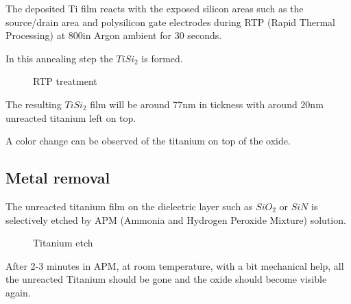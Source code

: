 The deposited Ti film reacts with the exposed silicon areas such as the source/drain area and polysilicon gate electrodes during RTP (Rapid Thermal Processing) at 800\degreesC in Argon ambient for 30 seconds.

In this annealing step the $Ti Si_2$ is formed.

\begin{figure}[H]
	\centering
	\begin{tikzpicture}[node distance = 3cm, auto, thick,scale=\CrossSectionOnly, every node/.style={transform shape}]
		
	\end{tikzpicture}
	\begin{tikzpicture}[node distance = 3cm, auto, thick,scale=\CrossSectionOnly, every node/.style={transform shape}]
		
	\end{tikzpicture}
	\caption{RTP treatment}
\end{figure}

The resulting $Ti Si_2$ film will be around 77nm in tickness with around 20nm unreacted titanium left on top.

A color change can be observed of the titanium on top of the oxide.

\subsection{Metal removal}

The unreacted titanium film on the dielectric layer such as $SiO_2$ or $SiN$ is selectively etched by APM (Ammonia and Hydrogen Peroxide Mixture) solution.

\begin{figure}[H]
	\centering
	\begin{tikzpicture}[node distance = 3cm, auto, thick,scale=\CrossSectionOnly, every node/.style={transform shape}]
		
	\end{tikzpicture}
	\begin{tikzpicture}[node distance = 3cm, auto, thick,scale=\CrossSectionOnly, every node/.style={transform shape}]
		
	\end{tikzpicture}
	\caption{Titanium etch}
\end{figure}

After 2-3 minutes in APM, at room temperature, with a bit mechanical help, all the unreacted Titanium should be gone and the oxide should become visible again.
